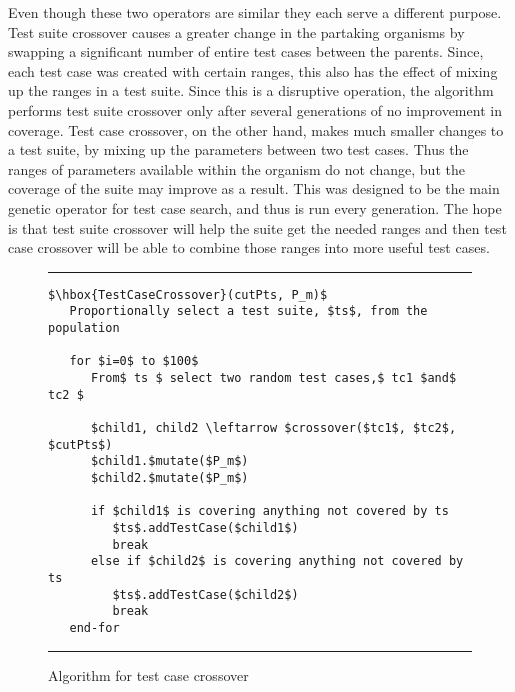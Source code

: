 \documentclass[runningheads]{llncs}
\begin{document}
Even though these two operators are similar they each serve a different purpose. Test suite crossover causes a greater change in the partaking organisms by swapping a significant number of entire test cases between the parents. Since, each test case was created with certain ranges, this also has the effect of mixing up the ranges in a test suite. Since this is a disruptive operation, the algorithm performs test suite crossover only after several generations of no improvement in coverage. Test case crossover, on the other hand, makes much smaller changes to a test suite, by mixing up the parameters between two test cases. Thus the ranges of parameters available within the organism do not change, but the coverage of the suite may improve as a result. This was designed to be the main genetic operator for test case search, and thus is run every generation. The hope is that test suite crossover will help the suite get the needed ranges and then test case crossover will be able to combine those ranges into more useful test cases.

\begin{figure}[h!]
	\begin{center}
		\hrule
		\medskip
		\begin{Verbatim}[fontfamily=tt, xleftmargin=10pt, commandchars=\\\{\},
		codes={\catcode`$=3\catcode`^=7\catcode`_=8}]
$\hbox{TestCaseCrossover}(cutPts, P_m)$  
   Proportionally select a test suite, $ts$, from the population

   for $i=0$ to $100$
      From$ ts $ select two random test cases,$ tc1 $and$ tc2 $

      $child1, child2 \leftarrow $crossover($tc1$, $tc2$, $cutPts$)
      $child1.$mutate($P_m$)
      $child2.$mutate($P_m$)

      if $child1$ is covering anything not covered by ts
         $ts$.addTestCase($child1$)
         break
      else if $child2$ is covering anything not covered by ts
         $ts$.addTestCase($child2$)
         break
   end-for
		\end{Verbatim}
		\hrule
	\end{center}
	\caption{Algorithm for test case crossover \label{fig:tcCross}}
\end{figure}
\end{document}
